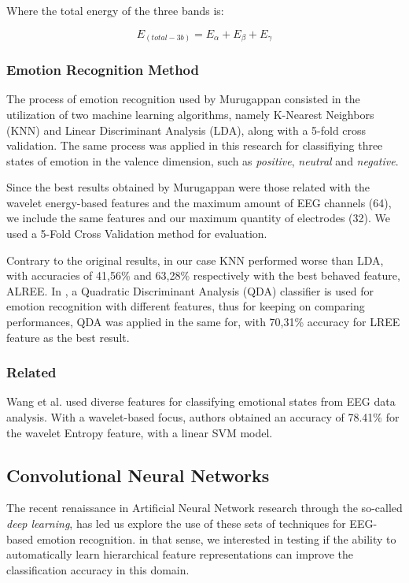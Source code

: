 \documentclass{sig-alternate}
\begin{document}
Where the total energy of the three bands is:

\begin{equation}
E_(total-3b) = E_\alpha + E_\beta + E_\gamma
\end{equation}

\subsubsection{Emotion Recognition Method}

The process of emotion recognition used by Murugappan consisted in the utilization of two machine learning algorithms, namely K-Nearest Neighbors (KNN) and Linear Discriminant Analysis (LDA), along with a 5-fold cross validation. The same process was applied in this research for classifiying three states of emotion in the valence dimension, such as \emph{positive}, \emph{neutral} and \emph{negative}.

Since the best results obtained by Murugappan were those related with the wavelet energy-based features and the maximum amount of EEG channels (64), we include the same features and our maximum quantity of electrodes (32). We used a 5-Fold Cross Validation method for evaluation.

Contrary to the original results, in our case KNN performed worse than LDA, with accuracies of 41,56\% and 63,28\% respectively with the best behaved feature, ALREE. In \cite{jenke2014feature}, a Quadratic Discriminant Analysis (QDA) classifier is used for emotion recognition with different features, thus for keeping on comparing performances, QDA was applied in the same for, with 70,31\% accuracy for LREE feature as the best result.

\subsubsection{Related}
Wang et al. \cite{wang2014} used diverse features for classifying emotional states from EEG data analysis. With a wavelet-based focus, authors obtained an accuracy of 78.41\% for the wavelet Entropy feature, with a linear SVM model.



\subsection{Convolutional Neural Networks}

The recent renaissance in Artificial Neural Network research 
through the so-called \emph{deep learning}, has led us explore 
the use of these sets of techniques for EEG-based emotion 
recognition. in that sense, we interested in testing if the ability
to automatically learn  hierarchical feature representations can
improve the classification accuracy in this domain. 
\end{document}
